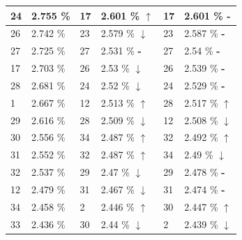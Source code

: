 \documentclass[letterpaper]{article}
\newcommand{\caseUp}[1][]{#1\textcolor[HTML]{008000}{$\mathbf{\uparrow}$}}
\newcommand{\caseStable}[1][]{#1\textcolor[HTML]{3779dd}{\textbf{-}}}
\newcommand{\caseDown}[1][]{#1\textcolor[HTML]{dd3737}{$\mathbf{\downarrow}$}}
\begin{document}
\begin{table}
\begin{tabular}{|l|l||l|l||l|l|}
	    \cellcolor[HTML]{FF4500} 24 & 2.755 \% & \cellcolor[HTML]{FF8C00} 17 & 2.601 \% \caseUp[\hfill] & \cellcolor[HTML]{FF8C00} 17 & 2.601 \% \caseStable[\hfill] \\ \hline 
	    \cellcolor[HTML]{E6E6FA} 26 & 2.742 \% & \cellcolor[HTML]{FFC1C1} 23 & 2.579 \% \caseDown[\hfill] & \cellcolor[HTML]{FFC1C1} 23 & 2.587 \% \caseStable[\hfill] \\ \hline 
	    \cellcolor[HTML]{FFD700} 27 & 2.725 \% & \cellcolor[HTML]{FFD700} 27 & 2.531 \% \caseStable[\hfill] & \cellcolor[HTML]{FFD700} 27 & 2.54 \% \caseStable[\hfill] \\ \hline 
	    \cellcolor[HTML]{FF8C00} 17 & 2.703 \% & \cellcolor[HTML]{E6E6FA} 26 & 2.53 \%  \caseDown[\hfill] & \cellcolor[HTML]{E6E6FA} 26 & 2.539 \% \caseStable[\hfill] \\ \hline 
	    \cellcolor[HTML]{FFD700} 28 & 2.681 \% & \cellcolor[HTML]{FF4500} 24 & 2.52 \%  \caseDown[\hfill] & \cellcolor[HTML]{FF4500} 24 & 2.529 \% \caseStable[\hfill] \\ \hline 
	    \cellcolor[HTML]{FFFFFF}  1 & 2.667 \% & \cellcolor[HTML]{FF69B4} 12 & 2.513 \% \caseUp[\hfill] & \cellcolor[HTML]{FFD700} 28 & 2.517 \% \caseUp[\hfill] \\ \hline 
	    \cellcolor[HTML]{FFFFF0} 29 & 2.616 \% & \cellcolor[HTML]{FFD700} 28 & 2.509 \% \caseDown[\hfill] & \cellcolor[HTML]{FF69B4} 12 & 2.508 \% \caseDown[\hfill] \\ \hline 
	    \cellcolor[HTML]{FFD700} 30 & 2.556 \% & \cellcolor[HTML]{EEEED1} 34 & 2.487 \% \caseUp[\hfill] & \cellcolor[HTML]{2E8B57} 32 & 2.492 \% \caseUp[\hfill] \\ \hline 
	    \cellcolor[HTML]{BEBEBE} 31 & 2.552 \% & \cellcolor[HTML]{2E8B57} 32 & 2.487 \% \caseUp[\hfill] & \cellcolor[HTML]{EEEED1} 34 & 2.49 \% \caseDown[\hfill] \\ \hline 
	    \cellcolor[HTML]{2E8B57} 32 & 2.537 \% & \cellcolor[HTML]{FFFFF0} 29 & 2.47 \%  \caseDown[\hfill] & \cellcolor[HTML]{FFFFF0} 29 & 2.478 \% \caseStable[\hfill] \\ \hline 
	    \cellcolor[HTML]{FF69B4} 12 & 2.479 \% & \cellcolor[HTML]{BEBEBE} 31 & 2.467 \% \caseDown[\hfill] & \cellcolor[HTML]{BEBEBE} 31 & 2.474 \% \caseStable[\hfill] \\ \hline 
	    \cellcolor[HTML]{EEEED1} 34 & 2.458 \% & \cellcolor[HTML]{A0522D}  2 & 2.446 \% \caseUp[\hfill] & \cellcolor[HTML]{FFD700} 30 & 2.447 \% \caseUp[\hfill] \\ \hline 
	    \cellcolor[HTML]{2E8B57} 33 & 2.436 \% & \cellcolor[HTML]{FFD700} 30 & 2.44 \%  \caseDown[\hfill] & \cellcolor[HTML]{A0522D} 2 & 2.439 \% \caseDown[\hfill] \\ \hline 

\end{tabular}
\end{table}
\end{document}

